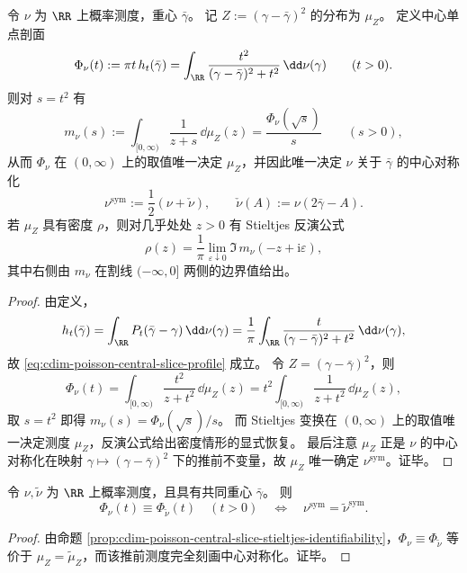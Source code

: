 \begin{proposition}\label{prop:cdim-poisson-central-slice-stieltjes-identifiability}
令 \(\nu\) 为 \(\RR\) 上概率测度，重心 \(\bar\gamma\)。
记 \(Z:=(\gamma-\bar\gamma)^2\) 的分布为 \(\mu_Z\)。
定义中心单点剖面
\begin{equation}\label{eq:cdim-poisson-central-slice-profile}
\Phi_\nu(t):=\pi t\,h_t(\bar\gamma)
=\int_{\RR}\frac{t^2}{(\gamma-\bar\gamma)^2+t^2}\,\dd\nu(\gamma)
\qquad(t>0).
\end{equation}
则对 \(s=t^2\) 有
\[
m_\nu(s):=\int_{[0,\infty)}\frac{1}{z+s}\,\dd\mu_Z(z)
=\frac{\Phi_\nu(\sqrt s)}{s}
\qquad(s>0),
\]
从而 \(\Phi_\nu\) 在 \((0,\infty)\) 上的取值唯一决定 \(\mu_Z\)，并因此唯一决定 \(\nu\) 关于 \(\bar\gamma\) 的中心对称化
\[
\nu^{\mathrm{sym}}:=\frac12(\nu+\check\nu),
\qquad
\check\nu(A):=\nu(2\bar\gamma-A).
\]
若 \(\mu_Z\) 具有密度 \(\rho\)，则对几乎处处 \(z>0\) 有 Stieltjes 反演公式
\[
\rho(z)=\frac{1}{\pi}\lim_{\varepsilon\downarrow 0}\Im\,m_\nu(-z+\mathrm{i}\varepsilon),
\]
其中右侧由 \(m_\nu\) 在割线 \((-\infty,0]\) 两侧的边界值给出。
\end{proposition}
\begin{proof}
由定义，
\[
h_t(\bar\gamma)=\int_{\RR}P_t(\bar\gamma-\gamma)\,\dd\nu(\gamma)
=\frac{1}{\pi}\int_{\RR}\frac{t}{(\gamma-\bar\gamma)^2+t^2}\,\dd\nu(\gamma),
\]
故 \eqref{eq:cdim-poisson-central-slice-profile} 成立。
令 \(Z=(\gamma-\bar\gamma)^2\)，则
\[
\Phi_\nu(t)=\int_{[0,\infty)}\frac{t^2}{z+t^2}\,\dd\mu_Z(z)
=t^2\int_{[0,\infty)}\frac{1}{z+t^2}\,\dd\mu_Z(z),
\]
取 \(s=t^2\) 即得 \(m_\nu(s)=\Phi_\nu(\sqrt s)/s\)。
而 Stieltjes 变换在 \((0,\infty)\) 上的取值唯一决定测度 \(\mu_Z\)，反演公式给出密度情形的显式恢复。
最后注意 \(\mu_Z\) 正是 \(\nu\) 的中心对称化在映射 \(\gamma\mapsto(\gamma-\bar\gamma)^2\) 下的推前不变量，故 \(\mu_Z\) 唯一确定 \(\nu^{\mathrm{sym}}\)。证毕。
\end{proof}

\begin{corollary}\label{cor:cdim-poisson-central-slice-kernel}
令 \(\nu,\widetilde\nu\) 为 \(\RR\) 上概率测度，且具有共同重心 \(\bar\gamma\)。
则
\[
\Phi_\nu(t)\equiv \Phi_{\widetilde\nu}(t)\quad(t>0)
\quad\Longleftrightarrow\quad
\nu^{\mathrm{sym}}=\widetilde\nu^{\mathrm{sym}}.
\]
\end{corollary}
\begin{proof}
由命题 \ref{prop:cdim-poisson-central-slice-stieltjes-identifiability}，\(\Phi_\nu\equiv\Phi_{\widetilde\nu}\) 等价于 \(\mu_Z=\widetilde\mu_Z\)，而该推前测度完全刻画中心对称化。证毕。
\end{proof}

